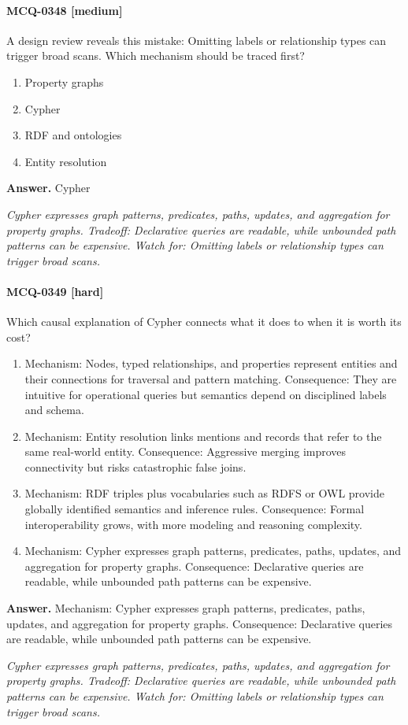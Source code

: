 \paragraph{MCQ-0348 [medium]} A design review reveals this mistake: Omitting labels or relationship types can trigger broad scans. Which mechanism should be traced first?
\begin{enumerate}[label=\Alph*.]
\item Property graphs
\item Cypher
\item RDF and ontologies
\item Entity resolution
\end{enumerate}
\noindent\textbf{Answer.} Cypher
\par\textit{Cypher expresses graph patterns, predicates, paths, updates, and aggregation for property graphs. Tradeoff: Declarative queries are readable, while unbounded path patterns can be expensive. Watch for: Omitting labels or relationship types can trigger broad scans.}
\paragraph{MCQ-0349 [hard]} Which causal explanation of Cypher connects what it does to when it is worth its cost?
\begin{enumerate}[label=\Alph*.]
\item Mechanism: Nodes, typed relationships, and properties represent entities and their connections for traversal and pattern matching. Consequence: They are intuitive for operational queries but semantics depend on disciplined labels and schema.
\item Mechanism: Entity resolution links mentions and records that refer to the same real-world entity. Consequence: Aggressive merging improves connectivity but risks catastrophic false joins.
\item Mechanism: RDF triples plus vocabularies such as RDFS or OWL provide globally identified semantics and inference rules. Consequence: Formal interoperability grows, with more modeling and reasoning complexity.
\item Mechanism: Cypher expresses graph patterns, predicates, paths, updates, and aggregation for property graphs. Consequence: Declarative queries are readable, while unbounded path patterns can be expensive.
\end{enumerate}
\noindent\textbf{Answer.} Mechanism: Cypher expresses graph patterns, predicates, paths, updates, and aggregation for property graphs. Consequence: Declarative queries are readable, while unbounded path patterns can be expensive.
\par\textit{Cypher expresses graph patterns, predicates, paths, updates, and aggregation for property graphs. Tradeoff: Declarative queries are readable, while unbounded path patterns can be expensive. Watch for: Omitting labels or relationship types can trigger broad scans.}
